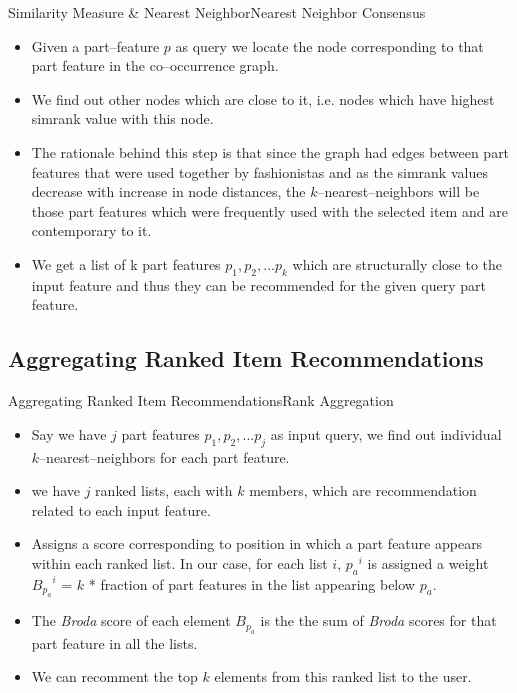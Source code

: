 \documentclass[10pt]{beamer}
\begin{document}
\begin{frame}{Similarity Measure \& Nearest Neighbor}{Nearest Neighbor Consensus}
\begin{itemize}
\item Given a part--feature $p$ as query we locate the node corresponding to that part feature in the co--occurrence graph.
\pause
\item We find out other nodes which are close to it, i.e. nodes which have highest simrank value with this node.
\pause
\item The rationale behind this step is that since the graph had edges between part features that were used together by fashionistas and as the simrank values decrease with increase in node distances, the $k$--nearest--neighbors will be those part features which were frequently used with the selected item and are contemporary to it.
\pause
\item We get a list of k part features $p_1, p_2, ... p_k$ which are structurally close to the input feature and thus they can be recommended for the given query part feature.
\end{itemize}
\end{frame}

\subsection{Aggregating Ranked Item Recommendations}
\begin{frame}{Aggregating Ranked Item Recommendations}{Rank Aggregation}
\begin{itemize}
\item Say we have $j$ part features $p_1, p_2, ... p_j$ as input query, we find out individual $k$--nearest--neighbors for each part feature.
\pause
\item we have $j$ ranked lists, each with $k$ members, which are recommendation related to each input feature.
\pause
\item Assigns a score corresponding to position in which a part feature appears within each ranked list. In our case, for each list $i$, ${p_a}^i$ is assigned a weight ${B_{p_a}}^i$ = $k$ * fraction of part features in the list appearing below $p_a$.
\pause
\item The \textit{Broda} score of each element $B_{p_a}$ is the the sum of \textit{Broda} scores for that part feature in all the lists.
\pause
\item We can recomment the top $k$ elements from this ranked list to the user.
\end{itemize}
\end{frame}
\end{document}
